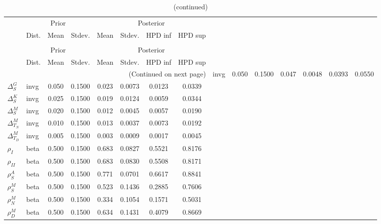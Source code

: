  
\begin{center}
\begin{longtable}{llcccccc} 
\caption{Results from Metropolis-Hastings (parameters)}
 \label{Table:MHPosterior:1}\\
\toprule 
  & \multicolumn{3}{c}{Prior}  &  \multicolumn{4}{c}{Posterior} \\
  \cmidrule(r{.75em}){2-4} \cmidrule(r{.75em}){5-8}
  & Dist. & Mean  & Stdev. & Mean & Stdev. & HPD inf & HPD sup\\
\midrule \endfirsthead 
\caption{(continued)}\\\toprule 
  & \multicolumn{3}{c}{Prior}  &  \multicolumn{4}{c}{Posterior} \\
  \cmidrule(r{.75em}){2-4} \cmidrule(r{.75em}){5-8}
  & Dist. & Mean  & Stdev. & Mean & Stdev. & HPD inf & HPD sup\\
\midrule \endhead 
\bottomrule \multicolumn{8}{r}{(Continued on next page)} \endfoot 
\bottomrule \endlastfoot 
${\Delta^{A}_{S}}$ & invg &   0.050 & 0.1500 &   0.047& 0.0048 &  0.0393 &  0.0550 \\ 
${\Delta^{G}_{S}}$ & invg &   0.050 & 0.1500 &   0.023& 0.0073 &  0.0123 &  0.0339 \\ 
${\Delta^{K}_{S}}$ & invg &   0.025 & 0.1500 &   0.019& 0.0124 &  0.0059 &  0.0344 \\ 
${\Delta^{M}_{S}}$ & invg &   0.020 & 0.1500 &   0.012& 0.0045 &  0.0057 &  0.0190 \\ 
${\Delta^{M}_{T_N}}$ & invg &   0.010 & 0.1500 &   0.013& 0.0037 &  0.0073 &  0.0192 \\ 
${\Delta^{M}_{T_D}}$ & invg &   0.005 & 0.1500 &   0.003& 0.0009 &  0.0017 &  0.0045 \\ 
${\rho_{I}}$ & beta &   0.500 & 0.1500 &   0.683& 0.0827 &  0.5521 &  0.8176 \\ 
${\rho_{II}}$ & beta &   0.500 & 0.1500 &   0.683& 0.0830 &  0.5508 &  0.8171 \\ 
${\rho^{A}_{S}}$ & beta &   0.500 & 0.1500 &   0.771& 0.0701 &  0.6617 &  0.8841 \\ 
${\rho^{M}_{S}}$ & beta &   0.500 & 0.1500 &   0.523& 0.1436 &  0.2885 &  0.7606 \\ 
${\rho^{M}_{N}}$ & beta &   0.500 & 0.1500 &   0.334& 0.1054 &  0.1571 &  0.5031 \\ 
${\rho^{M}_{D}}$ & beta &   0.500 & 0.1500 &   0.634& 0.1431 &  0.4079 &  0.8669 \\ 
\end{longtable}
 \end{center}
